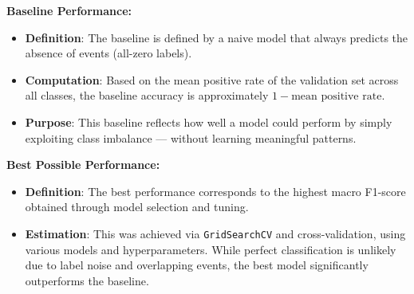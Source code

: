 \documentclass{article}
\begin{document}
\textbf{Baseline Performance:}
\begin{itemize}
    \item \textbf{Definition}: The baseline is defined by a naive model that always predicts the absence of events (all-zero labels).
    \item \textbf{Computation}: Based on the mean positive rate of the validation set across all classes, the baseline accuracy is approximately \( 1 - \text{mean positive rate} \).
    \item \textbf{Purpose}: This baseline reflects how well a model could perform by simply exploiting class imbalance — without learning meaningful patterns.
\end{itemize}

\textbf{Best Possible Performance:}
\begin{itemize}
    \item \textbf{Definition}: The best performance corresponds to the highest macro F1-score obtained through model selection and tuning.
    \item \textbf{Estimation}: This was achieved via \texttt{GridSearchCV} and cross-validation, using various models and hyperparameters. While perfect classification is unlikely due to label noise and overlapping events, the best model significantly outperforms the baseline.
\end{itemize}
\end{document}
